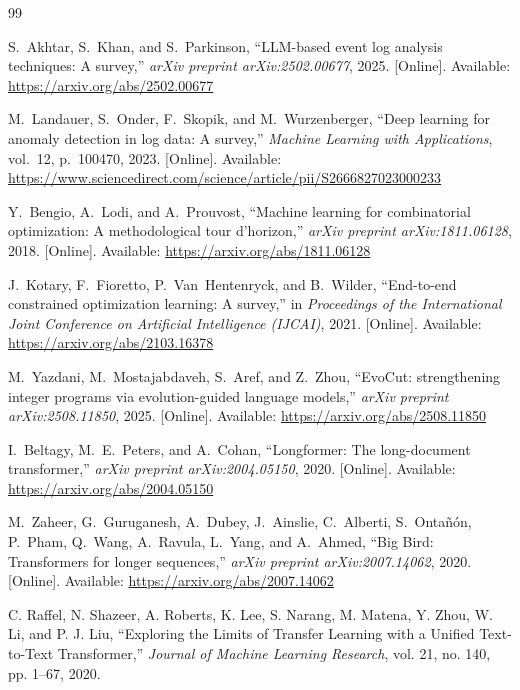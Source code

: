 \documentclass[11pt]{article}
\begin{document}
\begin{thebibliography}{99}

    S.~Akhtar, S.~Khan, and S.~Parkinson, ``LLM-based event log analysis techniques: A survey,''
    \emph{arXiv preprint arXiv:2502.00677}, 2025.
    [Online]. Available: \url{https://arxiv.org/abs/2502.00677}

    M.~Landauer, S.~Onder, F.~Skopik, and M.~Wurzenberger, ``Deep learning for anomaly detection in log data: A survey,''
    \emph{Machine Learning with Applications}, vol.~12, p.~100470, 2023.
    [Online]. Available: \url{https://www.sciencedirect.com/science/article/pii/S2666827023000233}

    Y.~Bengio, A.~Lodi, and A.~Prouvost, ``Machine learning for combinatorial optimization: A methodological tour d'horizon,''
    \emph{arXiv preprint arXiv:1811.06128}, 2018.
    [Online]. Available: \url{https://arxiv.org/abs/1811.06128}

    J.~Kotary, F.~Fioretto, P.~Van~Hentenryck, and B.~Wilder, ``End-to-end constrained optimization learning: A survey,''
    in \emph{Proceedings of the International Joint Conference on Artificial Intelligence (IJCAI)}, 2021.
    [Online]. Available: \url{https://arxiv.org/abs/2103.16378}

    M.~Yazdani, M.~Mostajabdaveh, S.~Aref, and Z.~Zhou, ``EvoCut: strengthening integer programs via evolution-guided language models,''
    \emph{arXiv preprint arXiv:2508.11850}, 2025.
    [Online]. Available: \url{https://arxiv.org/abs/2508.11850}

    I.~Beltagy, M.~E.~Peters, and A.~Cohan, ``Longformer: The long-document transformer,''
    \emph{arXiv preprint arXiv:2004.05150}, 2020.
    [Online]. Available: \url{https://arxiv.org/abs/2004.05150}
    
    M.~Zaheer, G.~Guruganesh, A.~Dubey, J.~Ainslie, C.~Alberti, S.~Ontañón, P.~Pham, Q.~Wang, A.~Ravula, L.~Yang, and A.~Ahmed, ``Big Bird: Transformers for longer sequences,''
    \emph{arXiv preprint arXiv:2007.14062}, 2020.
    [Online]. Available: \url{https://arxiv.org/abs/2007.14062}

    C. Raffel, N. Shazeer, A. Roberts, K. Lee, S. Narang, M. Matena, Y. Zhou, W. Li, and P. J. Liu,
    ``Exploring the Limits of Transfer Learning with a Unified Text-to-Text Transformer,''
    \textit{Journal of Machine Learning Research}, vol. 21, no. 140, pp. 1--67, 2020.
\end{thebibliography}
\end{document}
